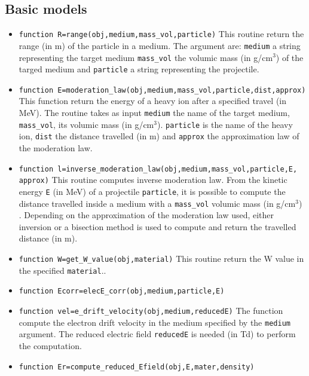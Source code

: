 \documentclass[10pt]{article}
\begin{document}
		\subsection{Basic models}
		\begin{itemize}
		\item \lstinline{function R=range(obj,medium,mass_vol,particle)} This routine return the range (in m) of the particle in a medium. The argument are: \lstinline{medium} a string representing the target medium \lstinline{mass_vol} the volumic mass (in g/cm$^{3}$) of the targed medium and \lstinline{particle} a string representing the projectile.
		\item \lstinline{function E=moderation_law(obj,medium,mass_vol,particle,dist,approx)} This function return the energy of a heavy ion after a specified travel (in MeV). The routine takes as input \lstinline{medium} the name of the target medium, \lstinline{mass_vol}, its volumic mass (in g/cm$^{3}$). \lstinline{particle} is the name of the heavy ion, \lstinline{dist} 
		the distance travelled (in m) and \lstinline{approx} the approximation law of the moderation law.  
		\item \lstinline{function l=inverse_moderation_law(obj,medium,mass_vol,particle,E, approx)} This routine computes inverse moderation law. From the kinetic energy \lstinline{E} (in MeV) of a projectile \lstinline{particle}, it is possible to compute the distance travelled inside a medium with a \lstinline{mass_vol} volumic mass (in g/cm$^{3}$) . Depending on the approximation of the moderation law used, either inversion or a bisection method is used to compute and return the travelled distance (in m).
		\item \lstinline{function W=get_W_value(obj,material)} This routine return the W value in the specified \lstinline{material}.. 
		\item \lstinline{function Ecorr=elecE_corr(obj,medium,particle,E)}
		\item \lstinline{function vel=e_drift_velocity(obj,medium,reducedE)} The function compute the electron drift velocity in the medium specified by the \lstinline{medium} argument. The reduced electric field \lstinline{reducedE} is needed (in Td) to perform the computation. 
		
		\item \lstinline{function Er=compute_reduced_Efield(obj,E,mater,density)}
		\end{itemize}
\end{document}
